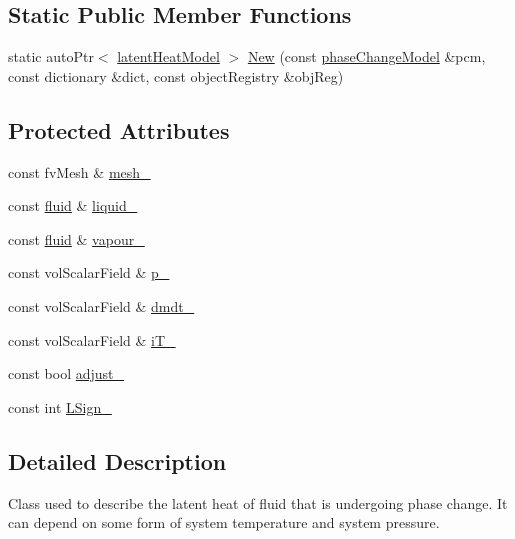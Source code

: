 \subsection*{Static Public Member Functions}
\begin{DoxyCompactItemize}
\item 
static auto\+Ptr$<$ \hyperlink{classFoam_1_1latentHeatModel}{latent\+Heat\+Model} $>$ \hyperlink{classFoam_1_1latentHeatModel_a446c6d4a78e7c47527b2ada3b5c1f13f}{New} (const \hyperlink{classFoam_1_1phaseChangeModel}{phase\+Change\+Model} \&pcm, const dictionary \&dict, const object\+Registry \&obj\+Reg)
\end{DoxyCompactItemize}
\subsection*{Protected Attributes}
\begin{DoxyCompactItemize}
\item 
const fv\+Mesh \& \hyperlink{classFoam_1_1latentHeatModel_a23edeeeecebcef11921a33dd5d990570}{mesh\+\_\+}
\item 
const \hyperlink{classFoam_1_1fluid}{fluid} \& \hyperlink{classFoam_1_1latentHeatModel_a908415555f3c334379400a3eb5759639}{liquid\+\_\+}
\item 
const \hyperlink{classFoam_1_1fluid}{fluid} \& \hyperlink{classFoam_1_1latentHeatModel_a2675e35060f71c22823e4a0b3c816dad}{vapour\+\_\+}
\item 
const vol\+Scalar\+Field \& \hyperlink{classFoam_1_1latentHeatModel_a4c9ce31e482786bbeeed352570fd8d09}{p\+\_\+}
\item 
const vol\+Scalar\+Field \& \hyperlink{classFoam_1_1latentHeatModel_a3af878570795997e0ebe0d6bb2780389}{dmdt\+\_\+}
\item 
const vol\+Scalar\+Field \& \hyperlink{classFoam_1_1latentHeatModel_ae6461c45deb7a8ee7e6b63fd5d6ddf80}{i\+T\+\_\+}
\item 
const bool \hyperlink{classFoam_1_1latentHeatModel_a03f285ffc1abb2fece5798b19bd65ac3}{adjust\+\_\+}
\item 
const int \hyperlink{classFoam_1_1latentHeatModel_a753d6d1aae8051c61707bd8706fa0204}{L\+Sign\+\_\+}
\end{DoxyCompactItemize}


\subsection{Detailed Description}
Class used to describe the latent heat of fluid that is undergoing phase change. It can depend on some form of system temperature and system pressure. 

